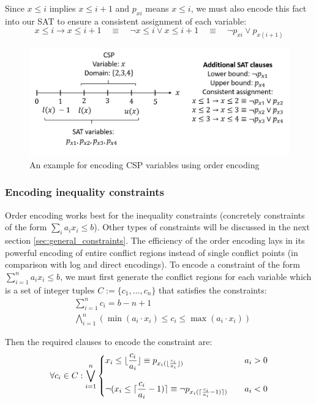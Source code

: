 Since $x \leq i$ implies $x \leq i+1$ and $p_{xi}$ means $x \leq i$, we must also encode this fact into our SAT to ensure a consistent assignment of each variable:
$$
x \leq i \rightarrow x \leq i + 1 \quad \equiv \quad
\neg x \leq i \vee x \leq i + 1 \quad \equiv \quad
\neg p_{xi} \vee p_{x(i+1)}
$$

\begin{figure}[H]
	\centering
	\includegraphics[width=0.7\linewidth]{assets/order_encoding_variables}
	\captionsetup{justification=centering,margin=2cm}
	\caption{An example for encoding CSP variables using order encoding}
	\label{fig:order_encoding_variables}
\end{figure}

\subsubsection{Encoding inequality constraints}
Order encoding works best for the inequality constraints (concretely constraints of the form $\sum_i a_i x_i \leq b$). Other types of constraints will be discussed in the next section \ref{sec:general_constraints}. The efficiency of the order encoding lays in its powerful encoding of entire conflict regions instead of single conflict points (in comparison with log and direct encodings). To encode a constraint of the form $\sum_{i=1}^n a_i x_i \leq b$, we must first generate the conflict regions for each variable which is a set of integer tuples $C := \{c_1, \dots, c_n \}$ that satisfies the constraints: 
\begin{align}
	&\sum_{i=1}^n c_i = b - n + 1 \\
	&\bigwedge_{i=1}^n (\min(a_i \cdot x_i) \leq c_i \leq \max(a_i \cdot x_i))
\end{align}

Then the required clauses to encode the constraint are:
\begin{equation}
\forall c_i \in C: \bigvee_{i=1}^n 
\begin{dcases}
	x_i \leq \lfloor \frac{c_i}{a_i} \rfloor \equiv
	 p_{x_i (\lfloor \frac{c_i}{a_i} \rfloor)} &\quad a_i > 0 \\[10pt]
	\neg (x_i \leq \lceil \frac{c_i}{a_i} - 1) \rceil \equiv
	 \neg p_{x_i (\lceil \frac{c_i}{a_i} - 1) \rceil)} &\quad a_i < 0 
\end{dcases}
\end{equation}

